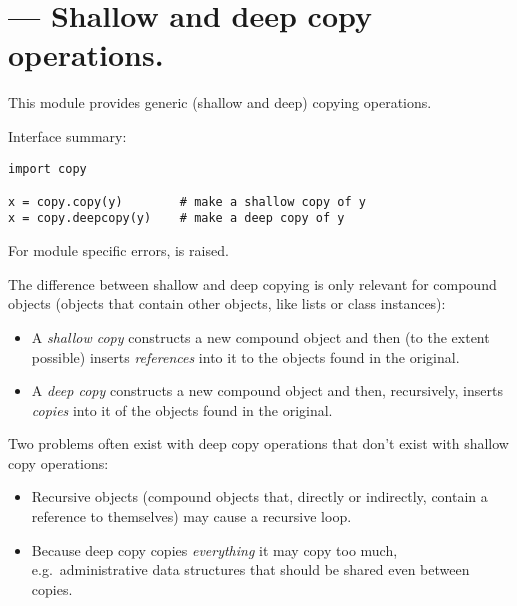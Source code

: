 \section{ ---
         Shallow and deep copy operations.}



This module provides generic (shallow and deep) copying operations.

Interface summary:

\begin{verbatim}
import copy

x = copy.copy(y)        # make a shallow copy of y
x = copy.deepcopy(y)    # make a deep copy of y
\end{verbatim}
%
For module specific errors,  is raised.

The difference between shallow and deep copying is only relevant for
compound objects (objects that contain other objects, like lists or
class instances):

\begin{itemize}

\item
A \emph{shallow copy} constructs a new compound object and then (to the
extent possible) inserts \emph{references} into it to the objects found
in the original.

\item
A \emph{deep copy} constructs a new compound object and then,
recursively, inserts \emph{copies} into it of the objects found in the
original.

\end{itemize}

Two problems often exist with deep copy operations that don't exist
with shallow copy operations:

\begin{itemize}

\item
Recursive objects (compound objects that, directly or indirectly,
contain a reference to themselves) may cause a recursive loop.

\item
Because deep copy copies \emph{everything} it may copy too much, e.g.\
administrative data structures that should be shared even between
copies.

\end{itemize}

